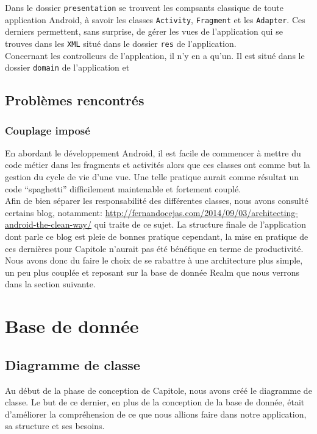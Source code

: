 Dans le dossier \texttt{presentation} se trouvent les compsants classique de toute application Android, à savoir les classes \texttt{Activity}, \texttt{Fragment} et les \texttt{Adapter}. Ces derniers permettent, sans surprise, de gérer les vues de l'application qui se trouves dans les \texttt{XML} situé dans le dossier \texttt{res} de l'application.\\

Concernant les controlleurs de l'applcation, il n'y en a qu'un. Il est situé dans le dossier \texttt{domain} de l'application et 

\subsection*{Problèmes rencontrés}
\subsubsection*{Couplage imposé}

En abordant le développement Android, il est facile de commencer à mettre du code métier dans les fragments et activités alors que ces classes ont comme but la gestion du cycle de vie d'une vue. Une telle pratique aurait comme résultat un code ``spaghetti'' difficilement maintenable et fortement couplé.\\

Afin de bien séparer les responsabilité des différentes classes, nous avons consulté certains blog, notamment: \url{http://fernandocejas.com/2014/09/03/architecting-android-the-clean-way/} qui traite de ce sujet. La structure finale de l'application dont parle ce blog est pleie de bonnes pratique cependant, la mise en pratique de ces dernières pour Capitole n'aurait pas été bénéfique en terme de productivité. Nous avons donc du faire le choix de se rabattre à une architecture plus simple, un peu plus couplée et reposant sur la base de donnée Realm que nous verrons dans la section suivante.


\section{Base de donnée}

\subsection*{Diagramme de classe}
Au début de la phase de conception de Capitole, nous avons créé le diagramme de classe. Le but de ce dernier, en plus de la conception de la base de donnée, était d'améliorer la compréhension de ce que nous allions faire dans notre application, sa structure et ses besoins.

